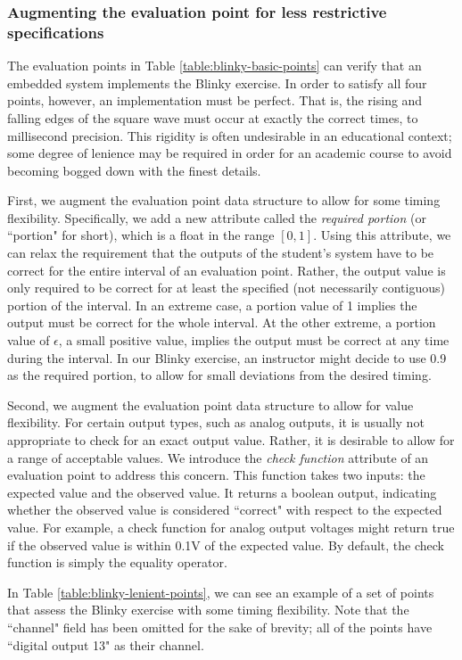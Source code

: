\documentclass[12pt]{article}
\begin{document}
\subsubsection{Augmenting the evaluation point for less restrictive specifications}
The evaluation points in Table \ref{table:blinky-basic-points} can verify that an embedded system implements the Blinky exercise.  In order to satisfy all four points, however, an implementation must be perfect.  That is, the rising and falling edges of the square wave must occur at exactly the correct times, to millisecond precision.  This rigidity is often undesirable in an educational context; some degree of lenience may be required in order for an academic course to avoid becoming bogged down with the finest details.

First, we augment the evaluation point data structure to allow for some timing flexibility.  Specifically, we add a new attribute called the \textit{required portion} (or ``portion" for short), which is a float in the range $[0,1]$.  Using this attribute, we can relax the requirement that the outputs of the student's system have to be correct for the entire interval of an evaluation point.  Rather, the output value is only required to be correct for at least the specified (not necessarily contiguous) portion of the interval.  In an extreme case, a portion value of 1 implies the output must be correct for the whole interval.  At the other extreme, a portion value of $\epsilon$, a small positive value, implies the output must be correct at any time during the interval.  In our Blinky exercise, an instructor might decide to use 0.9 as the required portion, to allow for small deviations from the desired timing.

Second, we augment the evaluation point data structure to allow for value flexibility.  For certain output types, such as analog outputs, it is usually not appropriate to check for an exact output value.  Rather, it is desirable to allow for a range of acceptable values.  We introduce the \textit{check function} attribute of an evaluation point to address this concern.  This function takes two inputs: the expected value and the observed value.  It returns a boolean output, indicating whether the observed value is considered ``correct" with respect to the expected value.  For example, a check function for analog output voltages might return true if the observed value is within 0.1V of the expected value.  By default, the check function is simply the equality operator.

In Table \ref{table:blinky-lenient-points}, we can see an example of a set of points that assess the Blinky exercise with some timing flexibility.  Note that the ``channel" field has been omitted for the sake of brevity; all of the points have ``digital output 13" as their channel.
\end{document}
